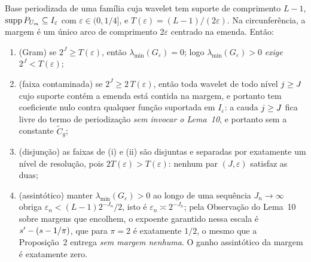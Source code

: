 \documentclass[11pt,a4paper]{article}
\newcommand{\lmin}{\lambda_{\min}}
\newcommand{\eps}{\varepsilon}
\newcommand{\Ieps}{I_{\eps}}
\begin{document}
\begin{proposition}\label{prop:cruzamento}
Base periodizada de uma família cuja wavelet tem suporte de comprimento $L-1$,
$\operatorname{supp}P_{U_{\md}}\subseteq\Ieps$ com $\eps\in(0,1/4]$, e
$T(\eps) = (L-1)/(2\eps)$. Na circunferência, a margem é um único arco de
comprimento $2\eps$ centrado na emenda. Então:
\begin{enumerate}[label=\textup{(\roman*)}, leftmargin=*]
  \item \textup{(Gram)} se $2^{J} \ge T(\eps)$, então $\lmin(G_{\eps}) = 0$;
    logo $\lmin(G_{\eps}) > 0$ \emph{exige} $2^{J} < T(\eps)$;
  \item \textup{(faixa contaminada)} se $2^{J} \ge 2\,T(\eps)$, então toda
    wavelet de todo nível $j\ge J$ cujo suporte contém a emenda está
    contida na margem, e portanto tem coeficiente nulo contra qualquer função
    suportada em $\Ieps$: a cauda $j\ge J$ fica livre do termo de
    periodização \emph{sem invocar o Lema~10}, e portanto sem a constante
    $\tilde C_{g}$;
  \item \textup{(disjunção)} as faixas de (i) e (ii) são disjuntas e
    separadas por exatamente um nível de resolução, pois
    $2T(\eps) > T(\eps)$: nenhum par $(J,\eps)$ satisfaz as duas;
  \item \textup{(assintótico)} manter $\lmin(G_{\eps}) > 0$ ao longo de uma
    sequência $J_{n}\to\infty$ obriga $\eps_{n} < (L-1)2^{-J_{n}}/2$, isto é
    $\eps_{n}\asymp 2^{-J_{n}}$; pela Observação do Lema~10 sobre margens que
    encolhem, o expoente garantido nessa escala é $s' - (s-1/\pi)$, que
    para $\pi = 2$ é exatamente $1/2$, o mesmo que a Proposição~2 entrega
    \emph{sem margem nenhuma}. O ganho assintótico da margem é exatamente
    zero.
\end{enumerate}
\end{proposition}
\end{document}

